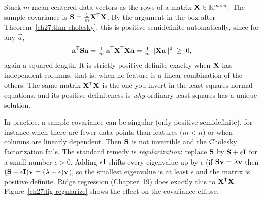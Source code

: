 \begin{example}
\label{ch27:ex-cov}
Stack $m$ mean-centered data vectors as the rows of a matrix $\mathbf{X}\in\mathbb{R}^{m\times n}$. The sample
covariance is $\mathbf{S} = \tfrac1m\mathbf{X}^{\mathsf{T}}\mathbf{X}$. By the argument in the box after
Theorem~\ref{ch27:thm-cholesky}, this is positive semidefinite automatically, since for any
$\vec{a}$,
\[
  \mathbf{a}^{\mathsf{T}}\mathbf{S}\mathbf{a} = \tfrac1m\,\mathbf{a}^{\mathsf{T}}\mathbf{X}^{\mathsf{T}}\mathbf{X}\mathbf{a}
  = \tfrac1m\,\lVert\mathbf{X}\mathbf{a}\rVert^2 \;\geq\; 0,
\]
again a squared length. It is strictly positive definite exactly when $\mathbf{X}$ has independent
columns, that is, when no feature is a linear combination of the others. The same matrix
$\mathbf{X}^{\mathsf{T}}\mathbf{X}$ is the one you invert in the least-squares normal equations, and its positive
definiteness is \emph{why} ordinary least squares has a unique solution.
\end{example}

\begin{trapbox}
In practice, a sample covariance can be singular (only positive semidefinite), for instance when
there are fewer data points than features ($m<n$) or when columns are linearly dependent. Then
$\mathbf{S}$ is not invertible and the Cholesky factorization fails. The standard remedy is
\emph{regularization}: replace $\mathbf{S}$ by $\mathbf{S} + \epsilon\mathbf{I}$ for a small number
$\epsilon>0$. Adding $\epsilon\mathbf{I}$ shifts every eigenvalue up by $\epsilon$ (if $\mathbf{S}\mathbf{v} =
\lambda\mathbf{v}$ then $(\mathbf{S}+\epsilon\mathbf{I})\mathbf{v} = (\lambda+\epsilon)\mathbf{v}$), so the smallest
eigenvalue is at least $\epsilon$ and the matrix is positive definite. Ridge regression
(Chapter~19) does exactly this to $\mathbf{X}^{\mathsf{T}}\mathbf{X}$. Figure~\ref{ch27:fig-regularize} shows the
effect on the covariance ellipse.
\end{trapbox}

